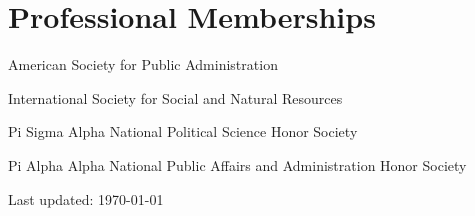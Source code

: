 \documentclass[12pt,letterpaper]{article}
\renewenvironment{itemize}{
  \begin{list}{}{
    \setlength{\leftmargin}{1.5em}
    \setlength{\itemsep}{0.25em}
    \setlength{\parskip}{0pt}
    \setlength{\parsep}{0.25em}
  }
}{
  \end{list}
}
\newcommand\tagpdfsetup[1]{}
\begin{document}
\section*{Professional Memberships}
\begin{itemize}\leftmargin=2pt\itemindent=-15pt
  \item American Society for Public Administration
  \item International Society for Social and Natural Resources
  \item Pi Sigma Alpha National Political Science Honor Society
  \item Pi Alpha Alpha National Public Affairs and Administration Honor Society
\end{itemize}

	
  \tagpdfsetup{activate-all=true, interwordspace=true}
\vspace{1em}
\begin{center}
  \begin{small}
    Last updated: \today
      \end{small}
\end{center}
\end{document}
